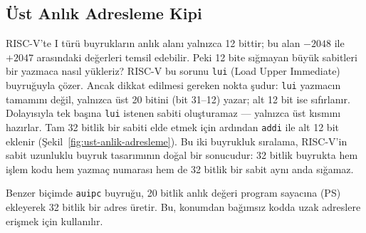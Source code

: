 \subsection{Üst Anlık Adresleme Kipi}
RISC-V'te I türü buyrukların anlık alanı yalnızca 12 bittir; bu alan $-2048$ ile $+2047$ arasındaki değerleri temsil edebilir. Peki 12 bite sığmayan büyük sabitleri bir yazmaca nasıl yükleriz? RISC-V bu sorunu \texttt{lui} (Load Upper Immediate) buyruğuyla çözer. Ancak dikkat edilmesi gereken nokta şudur: \texttt{lui} yazmacın tamamını değil, yalnızca üst 20 bitini (bit 31--12) yazar; alt 12 bit ise sıfırlanır. Dolayısıyla tek başına \texttt{lui} istenen sabiti oluşturamaz --- yalnızca üst kısmını hazırlar. Tam 32 bitlik bir sabiti elde etmek için ardından \texttt{addi} ile alt 12 bit eklenir (Şekil~\ref{fig:ust-anlik-adresleme}). Bu iki buyrukluk sıralama, RISC-V'in sabit uzunluklu buyruk tasarımının doğal bir sonucudur: 32 bitlik buyrukta hem işlem kodu hem yazmaç numarası hem de 32 bitlik bir sabit aynı anda sığamaz.

Benzer biçimde \texttt{auipc} buyruğu, 20 bitlik anlık değeri program sayacına (PS) ekleyerek 32 bitlik bir adres üretir. Bu, konumdan bağımsız kodda uzak adreslere erişmek için kullanılır.

